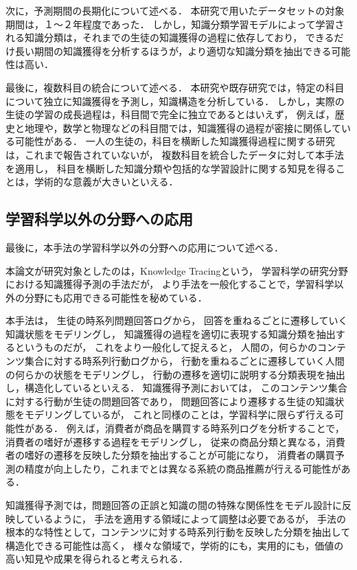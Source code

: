 次に，予測期間の長期化について述べる．
本研究で用いたデータセットの対象期間は，１〜２年程度であった．
しかし，知識分類学習モデルによって学習される知識分類は，それまでの生徒の知識獲得の過程に依存しており，
できるだけ長い期間の知識獲得を分析するほうが，より適切な知識分類を抽出できる可能性は高い．


最後に，複数科目の統合について述べる．
本研究や既存研究では，特定の科目について独立に知識獲得を予測し，知識構造を分析している．
しかし，実際の生徒の学習の成長過程は，科目間で完全に独立であるとはいえず，
例えば，歴史と地理や，数学と物理などの科目間では，知識獲得の過程が密接に関係している可能性がある．
一人の生徒の，科目を横断した知識獲得過程に関する研究は，これまで報告されていないが，
複数科目を統合したデータに対して本手法を適用し，
科目を横断した知識分類や包括的な学習設計に関する知見を得ることは，学術的な意義が大きいといえる．


\subsection{学習科学以外の分野への応用}
最後に，本手法の学習科学以外の分野への応用について述べる．

本論文が研究対象としたのは，Knowledge Tracingという，
学習科学の研究分野における知識獲得予測の手法だが，
より手法を一般化することで，学習科学以外の分野にも応用できる可能性を秘めている．

本手法は，
生徒の時系列問題回答ログから，
回答を重ねるごとに遷移していく知識状態をモデリングし，
知識獲得の過程を適切に表現する知識分類を抽出するというものだが，
これをより一般化して捉えると，
人間の，何らかのコンテンツ集合に対する時系列行動ログから，
行動を重ねるごとに遷移していく人間の何らかの状態をモデリングし，
行動の遷移を適切に説明する分類表現を抽出し，構造化しているといえる．
知識獲得予測においては，
このコンテンツ集合に対する行動が生徒の問題回答であり，
問題回答により遷移する生徒の知識状態をモデリングしているが，
これと同様のことは，学習科学に限らず行える可能性がある．
例えば，消費者が商品を購買する時系列ログを分析することで，
消費者の嗜好が遷移する過程をモデリングし，
従来の商品分類と異なる，消費者の嗜好の遷移を反映した分類を抽出することが可能になり，
消費者の購買予測の精度が向上したり，これまでとは異なる系統の商品推薦が行える可能性がある．

知識獲得予測では，問題回答の正誤と知識の間の特殊な関係性をモデル設計に反映しているように，
手法を適用する領域によって調整は必要であるが，
手法の根本的な特性として，コンテンツに対する時系列行動を反映した分類を抽出して構造化できる可能性は高く，
様々な領域で，学術的にも，実用的にも，価値の高い知見や成果を得られると考えられる．

